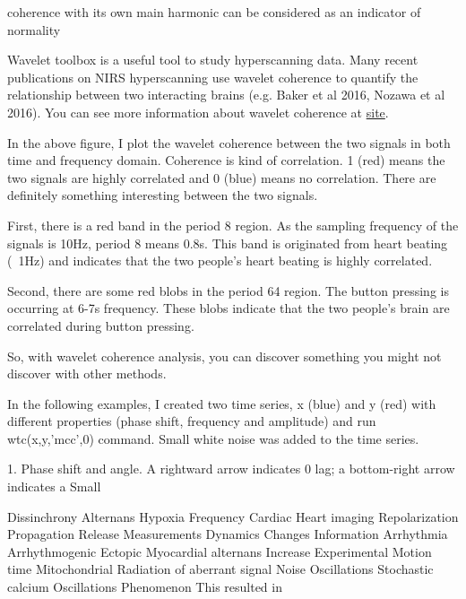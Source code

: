 \documentclass{biophys-new}
\begin{document}
coherence with its own main harmonic can be considered as an indicator of normality

Wavelet toolbox is a useful tool to study hyperscanning data. Many recent publications on NIRS hyperscanning use wavelet coherence to quantify the relationship between two interacting brains (e.g. Baker et al 2016, Nozawa et al 2016). You can see more information about wavelet coherence at \href{http://www.alivelearn.net/?p=1169}{site}.

In the above figure, I plot the wavelet coherence between the two signals in both time and frequency domain. Coherence is kind of correlation. 1 (red) means the two signals are highly correlated and 0 (blue) means no correlation. There are definitely something interesting between the two signals.

First, there is a red band in the period 8 region. As the sampling frequency of the signals is 10Hz, period 8 means 0.8s. This band is originated from heart beating (~1Hz) and indicates that the two people’s heart beating is highly correlated.

Second, there are some red blobs in the period 64 region. The button pressing is occurring at 6-7s frequency. These blobs indicate that the two people’s brain are correlated during button pressing.

So, with wavelet coherence analysis, you can discover something you might not discover with other methods.

In the following examples, I created two time series, x (blue) and y (red) with different properties (phase shift, frequency and amplitude) and run wtc(x,y,’mcc’,0) command. Small white noise was added to the time series.

1. Phase shift and angle.
A rightward arrow indicates 0 lag; a bottom-right arrow indicates a Small


Dissinchrony
Alternans
Hypoxia
Frequency
Cardiac
Heart imaging
Repolarization
Propagation
Release
Measurements
Dynamics
Changes
Information
Arrhythmia
Arrhythmogenic
Ectopic
Myocardial alternans
Increase
Experimental
Motion time
Mitochondrial
Radiation of aberrant signal
Noise
Oscillations
Stochastic calcium Oscillations
Phenomenon
This resulted in
\end{document}
